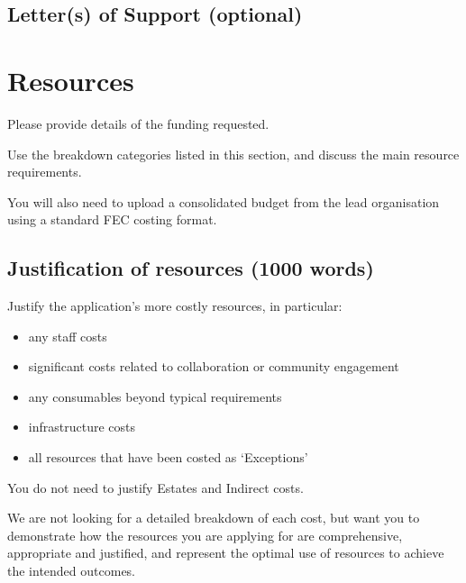 \documentclass[12pt]{article}
\newenvironment{instruction}{%
    \begin{tcolorbox}[colback=red!5,colframe=red,title=Instruction]%
}{%
    \end{tcolorbox}%
}
\begin{document}
\subsection*{Letter(s) of Support (optional)}

\pagebreak

\section*{Resources}

\begin{instruction}

Please provide details of the funding requested.

Use the breakdown categories listed in this section, and discuss the main resource requirements.

You will also need to upload a consolidated budget from the lead organisation using a standard FEC costing format.

\end{instruction}

\subsection*{Justification of resources (1000 words)}

\begin{instruction}

Justify the application’s more costly resources, in particular:

\begin{itemize}
    \item any staff costs
    \item significant costs related to collaboration or community engagement
    \item any consumables beyond typical requirements
    \item infrastructure costs
    \item all resources that have been costed as ‘Exceptions’
\end{itemize}

You do not need to justify Estates and Indirect costs.

We are not looking for a detailed breakdown of each cost, but want you to demonstrate how the resources you are applying for are comprehensive, appropriate and justified, and represent the optimal use of resources to achieve the intended outcomes.

\end{instruction}
\end{document}
